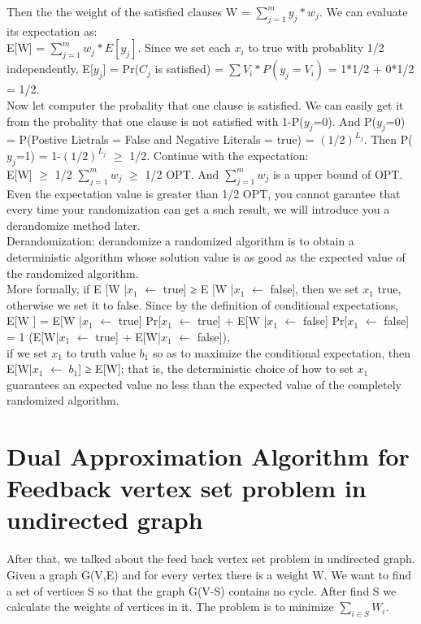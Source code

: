 \documentclass[usletter]{article}
\begin{document}
Then the the weight of the satisfied clauses W = $\sum_{j=1}^m y_j*w_j$. We can evaluate its expectation as: \\ E[W] = $\sum_{j=1}^m w_j*E[y_j]$. Since we set each $x_i$ to true with probablity 1/2 independently, E[$y_j$] = Pr($C_j$ is satisfied) = $\sum V_i * P(y_j = V_i)$ = 1*1/2 + 0*1/2 = 1/2. \\ Now let computer the probality that one clause is satisfied. We can easily get it from the probality that one clause is not satisfied with 1-P($y_j$=0). And P($y_j$=0) = P(Postive Lietrals = False and Negative Literals = true) = ${(1/2)}^{L_j}$. Then P($y_j$=1) = 1-${(1/2)}^{L_j}$ $\ge$ 1/2. Continue with the expectation: \\
E[W] $\ge$ 1/2 $\sum_{j=1}^m {w_j}$ $\ge$ 1/2 OPT. And $\sum_{j=1}^m {w_j}$ is a upper bound of OPT. Even the expectation value is greater than 1/2 OPT, you cannot garantee that every time your randomization can get a such result, we will introduce you a derandomize method later.\\
Derandomization: derandomize a randomized algorithm is to obtain a deterministic algorithm whose solution value is as good as the expected value of the randomized algorithm. \\
More formally, if E [W |$x_1$ $\leftarrow$ true] ≥ E [W |$x_1$ $\leftarrow$ false], then we set $x_1$ true, otherwise we set it to false. Since by the definition of conditional expectations, \\

E[W ] = E[W |$x_1$ $\leftarrow$ true] Pr[$x_1$ $\leftarrow$ true] + E[W |$x_1$ $\leftarrow$ false] Pr[$x_1$ $\leftarrow$ false] = 1 (E[W|$x_1$ $\leftarrow$ true] + E[W|$x_1$ $\leftarrow$ false]),\\
if we set $x_1$ to truth value $b_1$ so as to maximize the conditional expectation, then E[W|$x_1$ $\leftarrow$ $b_1$] ≥ E[W]; that is, the deterministic choice of how to set $x_1$ guarantees an expected value no less than the expected value of the completely randomized algorithm.


\section{Dual Approximation Algorithm for Feedback vertex set problem in undirected graph}
After that, we talked about the feed back vertex set problem in undirected graph. Given a graph G(V,E) and for every vertex there is a weight W.
We want to find a set of vertices S so that the graph G(V-S) contains no cycle. After find S we calculate the weights of vertices in it. The problem is to minimize $\sum_{i \in S} {W_i}$.
\end{document}
